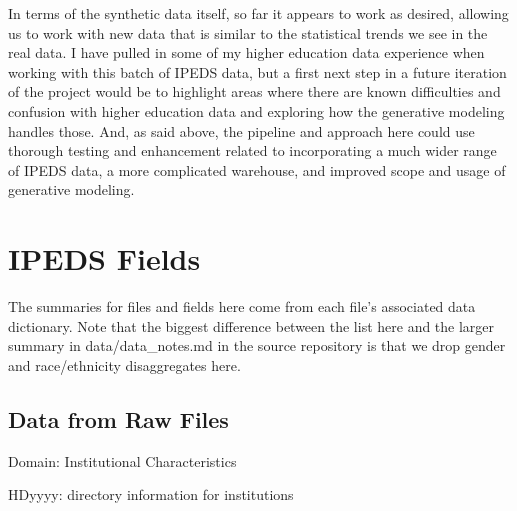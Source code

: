 \documentclass[sigconf, authorversion, nonacm]{acmart}
\begin{document}
    In terms of the synthetic data itself, so far it appears to work as desired, allowing us to work with new data that is similar to the statistical trends we see in the real data. I have pulled in some of my higher education data experience when working with this batch of IPEDS data, but a first next step in a future iteration of the project would be to highlight areas where there are known difficulties and confusion with higher education data and exploring how the generative modeling handles those. And, as said above, the pipeline and approach here could use thorough testing and enhancement related to incorporating a much wider range of IPEDS data, a more complicated warehouse, and improved scope and usage of generative modeling.




\appendix

\section{IPEDS Fields}
    The summaries for files and fields here come from each file's associated data dictionary. Note that the biggest difference between the list here and the larger summary in data/data\_notes.md in the source repository is that we drop gender and race/ethnicity disaggregates here.

    \subsection{Data from Raw Files}

        Domain: Institutional Characteristics

        HDyyyy: directory information for institutions
\end{document}
